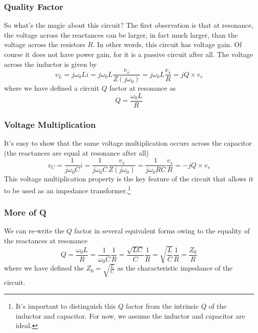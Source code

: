 \subsubsection{Quality Factor}
So what's the magic about this circuit?  The first observation is that at resonance, the voltage across the reactances can be larger, in fact much larger, than the voltage across the resistors $R$.  In other words, this circuit has voltage gain.  Of course it does not have power gain, for it is a passive circuit after all.  The voltage across the inductor is given by 
    \begin{equation}
        v_L = j\omega_0 L i = j\omega_0 L \frac{v_s}{Z(j\omega_0)} = 
        j\omega_0 L \frac{v_s}{R} = j Q \times v_s
    \end{equation}
where we have defined a circuit $Q$ factor at resonance as
    \begin{equation}
        Q = \frac{\omega_0 L}{R}
    \end{equation}
\subsubsection{Voltage Multiplication}
It's easy to show that the same voltage multiplication occurs across the capacitor (the reactances are equal at resonance after all)
    \begin{equation}
        v_C = \frac{1}{j\omega_0 C} i = \frac{1}{j\omega_0 C}
        \frac{v_s}{Z(j\omega_0)} = \frac{1}{j\omega_0 R C} \frac{v_s}{R} = - j Q
        \times v_s
    \end{equation}
This voltage multiplication property is the key feature of the circuit that allows it to be used as an impedance transformer.\footnote{It's important to distinguish this $Q$ factor from the intrinsic $Q$ of the inductor and capacitor.  For now, we assume the inductor  and capacitor are ideal.}
\subsubsection{More of Q}
We can re-write the $Q$ factor in several equivalent forms owing to the equality of the reactances at resonance
    \begin{equation} \label{eq:qdefs}
        Q = \frac{\omega_0 L}{R} = \frac{1}{\omega_0 C} \frac{1}{R} = \frac{\sqrt{LC}}{C} \frac{1}{R} = \sqrt{\frac{L}{C}} \frac{1}{R} = \frac{Z_0}{R}
    \end{equation}
where we have defined the $Z_0 = \sqrt{\tfrac{L}{C}}$ as the characteristic impedance of the circuit.
